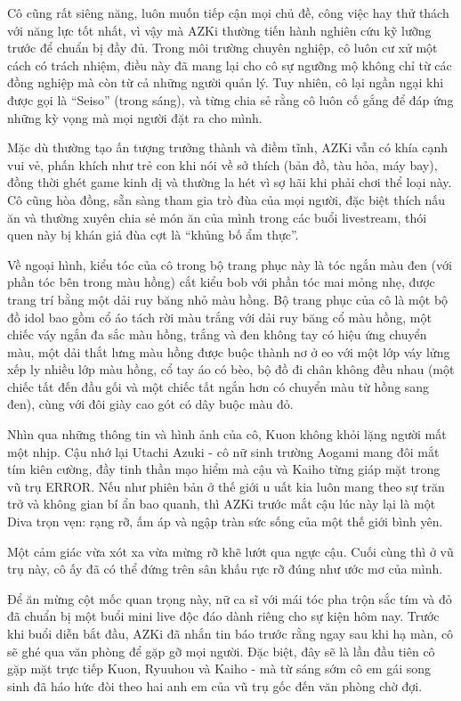 \documentclass[../main.tex]{subfiles}
\begin{document}
Cô cũng rất siêng năng, luôn muốn tiếp cận mọi chủ đề, công việc hay thử thách với năng lực tốt nhất, vì vậy mà AZKi thường tiến hành nghiên cứu kỹ lưỡng trước để chuẩn bị đầy đủ. Trong môi trường chuyên nghiệp, cô luôn cư xử một cách có trách nhiệm, điều này đã mang lại cho cô sự ngưỡng mộ không chỉ từ các đồng nghiệp mà còn từ cả những người quản lý. Tuy nhiên, cô lại ngần ngại khi được gọi là ``Seiso'' (trong sáng), và từng chia sẻ rằng cô luôn cố gắng để đáp ứng những kỳ vọng mà mọi người đặt ra cho mình.

Mặc dù thường tạo ấn tượng trưởng thành và điềm tĩnh, AZKi vẫn có khía cạnh vui vẻ, phấn khích như trẻ con khi nói về sở thích (bản đồ, tàu hỏa, máy bay), đồng thời ghét game kinh dị và thường la hét vì sợ hãi khi phải chơi thể loại này. Cô cũng hòa đồng, sẵn sàng tham gia trò đùa của mọi người, đặc biệt thích nấu ăn và thường xuyên chia sẻ món ăn của mình trong các buổi livestream, thói quen này bị khán giả đùa cợt là ``khủng bố ẩm thực''.

Về ngoại hình, kiểu tóc của cô trong bộ trang phục này là tóc ngắn màu đen (với phần tóc bên trong màu hồng) cắt kiểu bob với phần tóc mai mỏng nhẹ, được trang trí bằng một dải ruy băng nhỏ màu hồng. Bộ trang phục của cô là một bộ đồ idol bao gồm cổ áo tách rời màu trắng với dải ruy băng cổ màu hồng, một chiếc váy ngắn đa sắc màu hồng, trắng và đen không tay có hiệu ứng chuyển màu, một dải thắt lưng màu hồng được buộc thành nơ ở eo với một lớp váy lửng xếp ly nhiều lớp màu hồng, cổ tay áo có bèo, bộ đồ đi chân không đều nhau (một chiếc tất đến đầu gối và một chiếc tất ngắn hơn có chuyển màu từ hồng sang đen), cùng với đôi giày cao gót có dây buộc màu đỏ.

\chrint

Nhìn qua những thông tin và hình ảnh của cô, Kuon không khỏi lặng người mất một nhịp. Cậu nhớ lại Utachi Azuki - cô nữ sinh trường Aogami mang đôi mắt tím kiên cường, đầy tinh thần mạo hiểm mà cậu và Kaiho từng giáp mặt trong vũ trụ ERROR. Nếu như phiên bản ở thế giới u uất kia luôn mang theo sự trăn trở và không gian bí ẩn bao quanh, thì AZKi trước mắt cậu lúc này lại là một Diva trọn vẹn: rạng rỡ, ấm áp và ngập tràn sức sống của một thế giới bình yên.

Một cảm giác vừa xót xa vừa mừng rỡ khẽ lướt qua ngực cậu. Cuối cùng thì ở vũ trụ này, cô ấy đã có thể đứng trên sân khấu rực rỡ đúng như ước mơ của mình.

Để ăn mừng cột mốc quan trọng này, nữ ca sĩ với mái tóc pha trộn sắc tím và đỏ đã chuẩn bị một buổi mini live độc đáo dành riêng cho sự kiện hôm nay. Trước khi buổi diễn bắt đầu, AZKi đã nhắn tin báo trước rằng ngay sau khi hạ màn, cô sẽ ghé qua văn phòng để gặp gỡ mọi người. Đặc biệt, đây sẽ là lần đầu tiên cô gặp mặt trực tiếp Kuon, Ryuuhou và Kaiho - mà từ sáng sớm cô em gái song sinh đã háo hức đòi theo hai anh em của vũ trụ gốc đến văn phòng chờ đợi.
\end{document}
